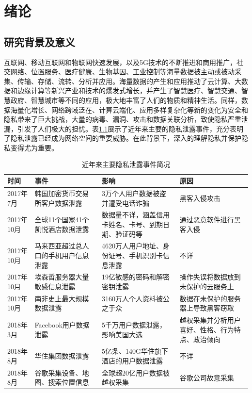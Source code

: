 \chapter{绪论}
\label{chap:intro}

\section{研究背景及意义}
互联网、移动互联网和物联网快速发展，以及5G技术的不断推进和商用推广，社交网络、位置服务、医疗健康、生物基因、工业控制等海量数据被主动或被动采集、传输、存储、流转、分析并应用。海量数据的产生和应用推动了云计算、大数据和边缘计算等新兴产业和技术的爆发式增长，并产生了智慧医疗、智慧交通、智慧政府、智慧城市等不同的应用，极大地丰富了人们的物质和精神生活。同样，数据海量化增长、网络跨域泛在、计算云端化、应用多样复杂化等新的变化为安全和隐私带来了巨大挑战，大量的病毒、漏洞、攻击和数据关联分析，致使隐私严重泄漏，引发了人们极大的担忧。表\ref{tab:privacy_leakeges}展示了近年来主要的隐私泄露事件，充分表明了隐私泄露已经成为网络空间的重要威胁。在此背景下，深入的理解隐私并保护隐私变得尤为重要。

\begin{table}[htbp]
\caption{近年来主要隐私泄露事件简况}
\label{tab:privacy_leakeges}
\centering
\begin{tabular}{p{}p{}p{}p{}}%

	\toprule
	\textbf{时间}&\textbf{事件}&\textbf{影响}&\textbf{原因}\\
	\midrule
	2017年7月 & 韩国加密货币交易所客户数据泄露 & 3万个人用户数据被盗并遭受电话诈骗 & 黑客入侵攻击\\
	2017年10月 & 全球11个国家41个凯悦酒店数据泄露 & 数据量不详，涵盖信用卡姓名、卡号、到期日期、验证码等 & 通过恶意软件进行黑客入侵\\
	2017年10月 & 马来西亚超过总人口的手机用户信息泄露 &4620万人用户地址、身份证号、手机识别卡信息泄露 & 不详\\
	2017年10月 & 埃森哲服务器大量敏感信息泄露 & 19亿敏感的密码和解密密钥泄露 & 操作失误将数据放到未保护的云服务上\\
	2017年10月 & 南非史上最大规模数据泄露 & 3160万人个人资料被公之于众 & 数据在未保护的服务器上导致黑客窃取\\
	2018年3月 & Facebook用户数据泄露 & 5千万用户数据泄露，影响美国大选 & 越权采集并分析用户喜好、性格、行为特点、政治倾向\\
	2018年8月 & 华住集团数据泄露 & 5亿条、140G华住旗下酒店的用户数据泄露 & 不详\\
	2018年8月 & 谷歌采集设备、地图、搜索位置信息 & 全球超20亿用户数据被越权采集 & 谷歌公司故意采集\\
\bottomrule
\end{tabular}
\end{table}

